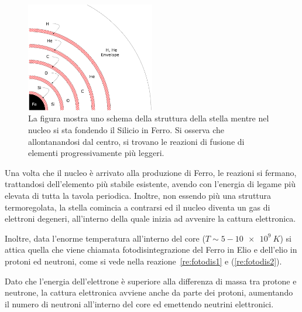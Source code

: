 \begin{figure}
    \centering
    \includegraphics[width = 0.5\textwidth]{immagini/onion.png}
    \caption{La figura mostra uno schema della struttura della stella mentre nel nucleo si sta fondendo il Silicio in Ferro. Si osserva che allontanandosi dal centro, si trovano le reazioni di fusione di elementi progressivamente più leggeri.}\label{fig:onion}
\end{figure}

Una volta che il nucleo è arrivato alla produzione di Ferro, le reazioni si fermano, trattandosi dell'elemento più stabile esistente, avendo con l'energia di legame più elevata di tutta la tavola periodica. Inoltre, non essendo più una struttura termoregolata, la stella comincia a contrarsi ed il nucleo diventa un gas di elettroni degeneri, all'interno della quale inizia ad avvenire la cattura elettronica. 


Inoltre, data l'enorme temperatura all'interno del core ($T \sim 5-\SI{10e9}{K}$) si attica quella che viene chiamata fotodisintegrazione del Ferro in Elio e dell'elio in protoni ed neutroni, come si vede nella reazione~\ref{re:fotodis1} e (\ref{re:fotodis2}).


Dato che l'energia dell'elettrone è superiore alla differenza di massa tra protone e neutrone, la cattura elettronica avviene anche da parte dei protoni, aumentando il numero di neutroni all'interno del core ed emettendo neutrini elettronici.

